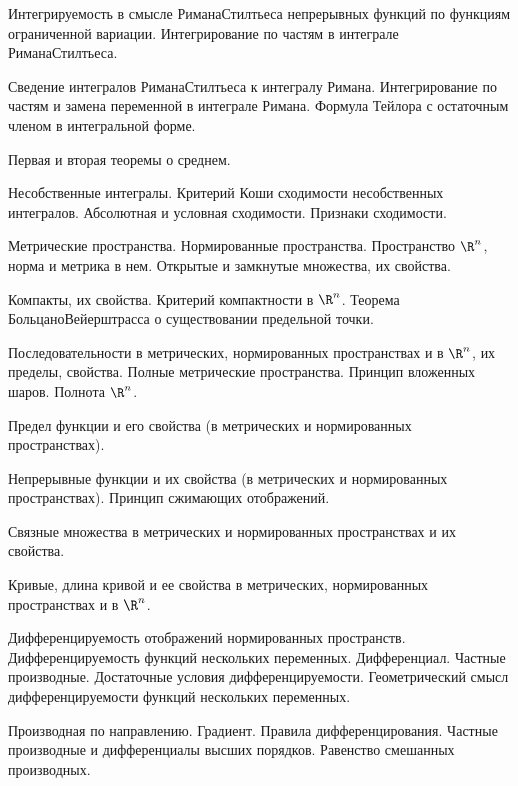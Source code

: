 \documentclass[a4paper]{article}
\begin{document}
\begin{nums}{-2}
\item Интегрируемость в смысле Римана\ч Стилтьеса непрерывных функций по функциям
ограниченной вариации. Интегрирование по частям в интеграле Римана\ч Стилтьеса.

\item Сведение интегралов Римана\ч Стилтьеса к интегралу Римана. Интегрирование по частям
и замена переменной в интеграле Римана. Формула Тейлора с остаточным членом
в интегральной форме.

\item Первая и вторая теоремы о среднем.

\item Несобственные интегралы. Критерий Коши сходимости несобственных интегралов.
Абсолютная и условная сходимости. Признаки сходимости.

\item Метрические пространства. Нормированные пространства. Пространство $\R^n$, норма и
метрика в нем. Открытые и замкнутые множества, их свойства.

\item Компакты, их свойства. Критерий компактности в $\R^n$. Теорема Больцано\ч Вейерштрасса
о существовании предельной точки.

\item Последовательности в метрических, нормированных пространствах и в $\R^n$, их пределы,
свойства. Полные метрические пространства. Принцип вложенных шаров. Полнота $\R^n$.

\item Предел функции и его свойства (в метрических и нормированных пространствах).

\item Непрерывные функции и их свойства (в метрических и нормированных пространствах).
Принцип сжимающих отображений.

\item Связные множества в метрических и нормированных пространствах и их свойства.

\item Кривые, длина кривой и ее свойства в метрических, нормированных пространствах и
в $\R^n$.

\item Дифференцируемость отображений нормированных пространств. Дифференцируемость
функций нескольких переменных. Дифференциал. Частные производные. Достаточные
условия дифференцируемости. Геометрический смысл дифференцируемости функций
нескольких переменных.

\item Производная по направлению. Градиент. Правила дифференцирования.
Частные производные и дифференциалы высших порядков. Равенство смешанных производных.


\end{nums}
\end{document}
